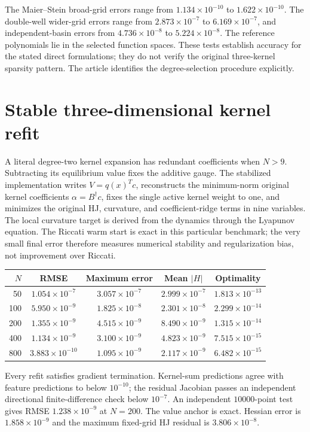 \documentclass[11pt,a4paper]{article}
\begin{document}
The Maier--Stein broad-grid errors range from $1.134\times10^{-10}$ to $1.622\times10^{-10}$. The double-well wider-grid errors range from $2.873\times10^{-7}$ to $6.169\times10^{-7}$, and independent-basin errors from $4.736\times10^{-8}$ to $5.224\times10^{-8}$. The reference polynomials lie in the selected function spaces. These tests establish accuracy for the stated direct formulations; they do not verify the original three-kernel sparsity pattern. The article identifies the degree-selection procedure explicitly.

\section*{Stable three-dimensional kernel refit}
A literal degree-two kernel expansion has redundant coefficients when $N>9$. Subtracting its equilibrium value fixes the additive gauge. The stabilized implementation writes $V=q(x)^Tc$, reconstructs the minimum-norm original kernel coefficients $\alpha=B^\dagger c$, fixes the single active kernel weight to one, and minimizes the original HJ, curvature, and coefficient-ridge terms in nine variables. The local curvature target is derived from the dynamics through the Lyapunov equation. The Riccati warm start is exact in this particular benchmark; the very small final error therefore measures numerical stability and regularization bias, not improvement over Riccati.

\begin{center}\small\begin{tabular}{rcccc}\toprule
$N$ & RMSE & Maximum error & Mean $|H|$ & Optimality\\\midrule
50 & $1.054\times10^{-7}$ & $3.057\times10^{-7}$ & $2.999\times10^{-7}$ & $1.813\times10^{-13}$ \\
100 & $5.950\times10^{-9}$ & $1.825\times10^{-8}$ & $2.301\times10^{-8}$ & $2.299\times10^{-14}$ \\
200 & $1.355\times10^{-9}$ & $4.515\times10^{-9}$ & $8.490\times10^{-9}$ & $1.315\times10^{-14}$ \\
400 & $1.134\times10^{-9}$ & $3.100\times10^{-9}$ & $4.823\times10^{-9}$ & $7.515\times10^{-15}$ \\
800 & $3.883\times10^{-10}$ & $1.095\times10^{-9}$ & $2.117\times10^{-9}$ & $6.482\times10^{-15}$ \\
\bottomrule\end{tabular}\end{center}
Every refit satisfies gradient termination. Kernel-sum predictions agree with feature predictions to below $10^{-10}$; the residual Jacobian passes an independent directional finite-difference check below $10^{-7}$. An independent $10000$-point test gives RMSE $1.238\times10^{-9}$ at $N=200$. The value anchor is exact. Hessian error is $1.858\times10^{-9}$ and the maximum fixed-grid HJ residual is $3.806\times10^{-8}$.
\end{document}
